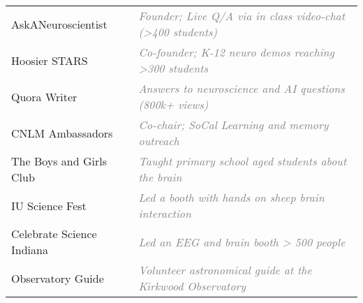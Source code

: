 \documentclass[10pt]{cooperCV2}
\begin{document}
\begin{longtable}{@{} l @{\extracolsep{\fill}}  l @{}}
	 
	AskANeuroscientist & \textcolor{grey}{ \textit{Founder; Live Q/A via in class video-chat (>400 students)}} \\
	 
	Hoosier STARS & \textcolor{grey}{ \textit{Co-founder; K-12 neuro demos reaching >300 students}} \\
	 
	Quora Writer & \textcolor{grey}{ \textit{Answers to neuroscience and AI questions (800k+ views)}} \\
	 
	CNLM Ambassadors & \textcolor{grey}{ \textit{Co-chair; SoCal Learning and memory outreach}} \\
	 
	The Boys and Girls Club & \textcolor{grey}{ \textit{Taught primary school aged students about the brain}} \\
	 
	IU Science Fest & \textcolor{grey}{ \textit{Led a booth with hands on sheep brain interaction}} \\
	 
	Celebrate Science Indiana & \textcolor{grey}{ \textit{Led an EEG and brain booth > 500 people}} \\
	 
	Observatory Guide & \textcolor{grey}{ \textit{Volunteer astronomical guide at the Kirkwood Observatory}} \\
	
\end{longtable}






%	





\end{document}
